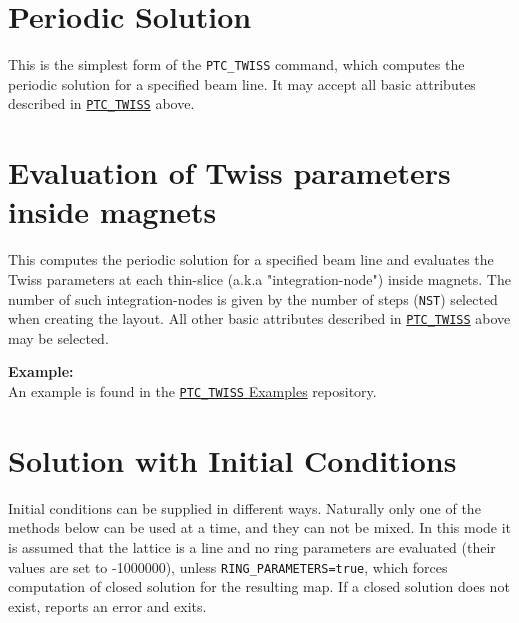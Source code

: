 \section{Periodic Solution}
\label{sec:ptc-twiss-periodic}	

This is the simplest form of the \texttt{PTC\_TWISS} command, which
computes the periodic solution for a specified beam line. It may
accept all basic attributes described in
\hyperref[sec:ptc-twiss]{\texttt{PTC\_TWISS}} above. 



\section{Evaluation of Twiss parameters inside magnets}
\label{sec:ptc-twiss-slicing}

This computes the periodic solution for a specified beam
line and evaluates the Twiss parameters at each thin-slice
(a.k.a "integration-node") inside magnets. The number of such
integration-nodes is given by the number of steps (\texttt{NST})
selected when creating the \ptc layout. All other basic
attributes described in \hyperref[sec:ptc-twiss]{\texttt{PTC\_TWISS}}
above may be selected.



\textbf{Example:} \\
An example is found in the
\href{http://madx.web.cern.ch/madx/madX/examples/ptc_twiss/SliceMagnets/}
{\texttt{PTC\_TWISS} Examples} repository. 



\section{Solution with Initial Conditions}
\label{sec:ptc-twiss-sol-initial-cond}


Initial conditions can be supplied in different ways.  Naturally only
one of the methods below can be used at a time, and they can not be
mixed.  In this mode it is assumed that the lattice is a line and no
ring parameters are evaluated (their values are set to -1000000), unless
\texttt{RING\_PARAMETERS=true}, which forces computation of closed solution
for the resulting map. If a closed solution does not exist, \ptc
reports an error and exits.

